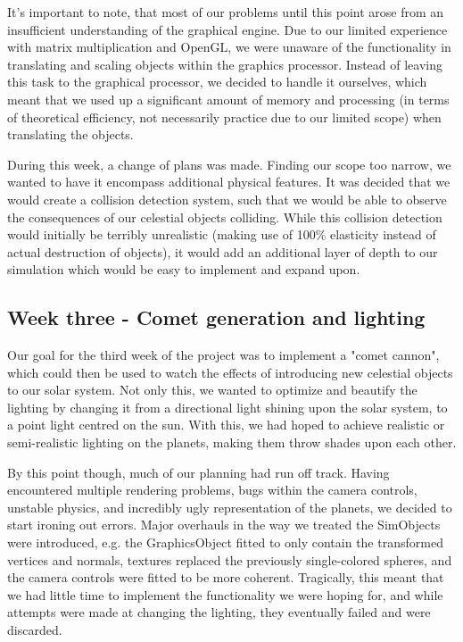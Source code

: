 It's important to note, that most of our problems until this point arose from an insufficient understanding of the graphical engine. Due to our limited experience with matrix multiplication and OpenGL, we were unaware of the functionality in translating and scaling objects within the graphics processor. Instead of leaving this task to the graphical processor, we decided to handle it ourselves, which meant that we used up a significant amount of memory and processing (in terms of theoretical efficiency, not necessarily practice due to our limited scope) when translating the objects.

During this week, a change of plans was made. Finding our scope too narrow, we wanted to have it encompass additional physical features. It was decided that we would create a collision detection system, such that we would be able to observe the consequences of our celestial objects colliding. While this collision detection would initially be terribly unrealistic (making use of 100\% elasticity instead of actual destruction of objects), it would add an additional layer of depth to our simulation which would be easy to implement and expand upon.

\subsection{Week three - Comet generation and lighting}
Our goal for the third week of the project was to implement a "comet cannon", which could then be used to watch the effects of introducing new celestial objects to our solar system. Not only this, we wanted to optimize and beautify the lighting by changing it from a directional light shining upon the solar system, to a point light centred on the sun. With this, we had hoped to achieve realistic or semi-realistic lighting on the planets, making them throw shades upon each other.

By this point though, much of our planning had run off track. Having encountered multiple rendering problems, bugs within the camera controls, unstable physics, and incredibly ugly representation of the planets, we decided to start ironing out errors. Major overhauls in the way we treated the SimObjects were introduced, e.g. the GraphicsObject fitted to only contain the transformed vertices and normals, textures replaced the previously single-colored spheres, and the camera controls were fitted to be more coherent. Tragically, this meant that we had little time to implement the functionality we were hoping for, and while attempts were made at changing the lighting, they eventually failed and were discarded. 

